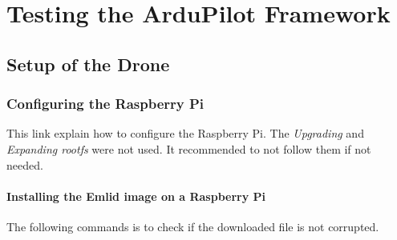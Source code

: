 \chapter{Testing the ArduPilot Framework}

    \section{Setup of the Drone}
        \subsection{Configuring the Raspberry Pi}
            This link \cite{emlid_rpi_config} explain how to configure the Raspberry Pi. The \textit{Upgrading} and \textit{Expanding rootfs} were not used. It recommended to not follow them if not needed.
            
            \subsubsection{Installing the Emlid image on a Raspberry Pi}
                The following commands is to check if the downloaded file is not corrupted.

